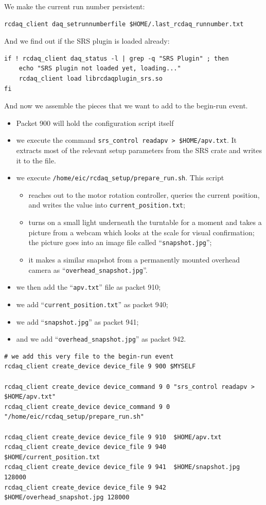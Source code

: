 \documentclass{article}[11pt]
\begin{document}
We make the current run number persistent:

\begin{verbatim} 
rcdaq_client daq_setrunnumberfile $HOME/.last_rcdaq_runnumber.txt
\end{verbatim} 

And we find out if the SRS plugin is loaded already:

\begin{verbatim} 
if ! rcdaq_client daq_status -l | grep -q "SRS Plugin" ; then
    echo "SRS plugin not loaded yet, loading..."
    rcdaq_client load librcdaqplugin_srs.so
fi
\end{verbatim} 


And now we assemble the pieces that we want to add to the begin-run event. 
\begin{itemize}
\item Packet 900 will hold the configuration script itself
\item we execute the command \verb|srs_control readapv > $HOME/apv.txt|. It extracts 
most of the relevant setup parameters from the SRS crate and writes it to the file.
\item we execute  \verb|/home/eic/rcdaq_setup/prepare_run.sh|. This script 

\begin{itemize} 
\item reaches out to the motor rotation controller, queries the current
  position, and writes the value into \verb|current_position.txt|;
\item turns on a small light underneath the turntable for a moment and
 takes a picture from a webcam which looks at the scale for visual confirmation; the picture goes into an image file called
``\verb|snapshot.jpg|'';
\item it makes a similar snapshot from a permanently mounted overhead camera as ``\verb|overhead_snapshot.jpg|''.
\end{itemize}

\item we then add the ``\verb|apv.txt|'' file as packet 910;
\item we add ``\verb|current_position.txt|'' as packet 940; 
\item we add ``\verb|snapshot.jpg|'' as packet 941;
\item and we add ``\verb|overhead_snapshot.jpg|'' as packet 942.
\end{itemize}

\begin{verbatim} 
# we add this very file to the begin-run event
rcdaq_client create_device device_file 9 900 $MYSELF

rcdaq_client create_device device_command 9 0 "srs_control readapv > $HOME/apv.txt"
rcdaq_client create_device device_command 9 0 "/home/eic/rcdaq_setup/prepare_run.sh"

rcdaq_client create_device device_file 9 910  $HOME/apv.txt
rcdaq_client create_device device_file 9 940  $HOME/current_position.txt
rcdaq_client create_device device_file 9 941  $HOME/snapshot.jpg 128000
rcdaq_client create_device device_file 9 942  $HOME/overhead_snapshot.jpg 128000
\end{verbatim} 
\end{document}
